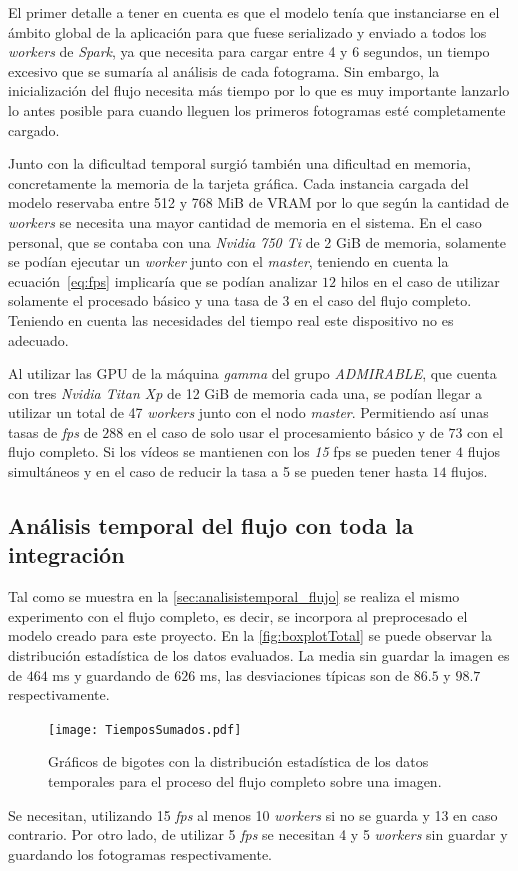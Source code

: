 El primer detalle a tener en cuenta es que el modelo tenía que instanciarse en el ámbito global de la aplicación para que fuese serializado y enviado a todos los \textit{workers} de \textit{Spark}, ya que necesita para cargar entre 4 y 6 segundos, un tiempo excesivo que se sumaría al análisis de cada fotograma. Sin embargo, la inicialización del flujo necesita más tiempo por lo que es muy importante lanzarlo lo antes posible para cuando lleguen los primeros fotogramas esté completamente cargado.

Junto con la dificultad temporal surgió también una dificultad en memoria, concretamente la memoria de la tarjeta gráfica. Cada instancia cargada del modelo reservaba entre 512 y 768 MiB de VRAM por lo que según la cantidad de \textit{workers} se necesita una mayor cantidad de memoria en el sistema. En el caso personal, que se contaba con una \textit{Nvidia 750 Ti} de 2 GiB de memoria, solamente se podían ejecutar un \textit{worker} junto con el \textit{master}, teniendo en cuenta la ecuación~\ref{eq:fps} implicaría que se podían analizar $12$ hilos en el caso de utilizar solamente el procesado básico y una tasa de $3$ en el caso del flujo completo. Teniendo en cuenta las necesidades del tiempo real este dispositivo no es adecuado.

Al utilizar las GPU de la máquina \textit{gamma} del grupo \textit{ADMIRABLE}, que cuenta con tres \textit{Nvidia Titan Xp} de 12 GiB de memoria cada una, se podían llegar a utilizar un total de 47 \textit{workers} junto con el nodo \textit{master}. Permitiendo así unas tasas de \textit{fps} de $288$ en el caso de solo usar el procesamiento básico y de $73$ con el flujo completo. Si los vídeos se mantienen con los \textit{15} fps se pueden tener $4$ flujos simultáneos y en el caso de reducir la tasa a 5 se pueden tener hasta $14$ flujos.


\subsection{Análisis temporal del flujo con toda la integración}\label{sec:analisistemporal}

Tal como se muestra en la \autoref{sec:analisistemporal_flujo} se realiza el mismo experimento con el flujo completo, es decir, se incorpora al preprocesado el modelo creado para este proyecto. En la \autoref{fig:boxplotTotal} se puede observar la distribución estadística de los datos evaluados. La media sin guardar la imagen es de $464$ ms y guardando de $626$ ms, las desviaciones típicas son de $86.5$ y $98.7$ respectivamente.

\begin{figure}[h]
	\texttt{[image: TiemposSumados.pdf]}
	\caption{Gráficos de bigotes con la distribución estadística de los datos temporales para el proceso del flujo completo sobre una imagen.}
	\label{fig:boxplotTotal}
\end{figure}

Se necesitan, utilizando 15 \textit{fps} al menos 10 \textit{workers} si no se guarda y 13 en caso contrario. Por otro lado, de utilizar 5 \textit{fps} se necesitan 4 y 5 \textit{workers} sin guardar y guardando los fotogramas respectivamente.